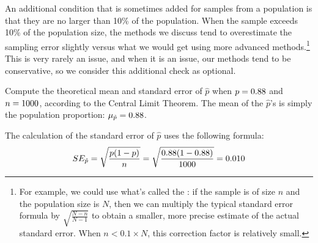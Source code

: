 An additional condition that is sometimes added for samples
from a population is that they are no larger than 10\% of
the population.
When the sample exceeds 10\% of the population size,
the methods we discuss tend to overestimate the sampling error
slightly versus what we would get using more advanced
methods.\footnote{For example, we could use what's called the
  :
  if the sample is of size $n$ and the population size is $N$,
  then we can multiply the typical standard error formula by
  $\sqrt{\frac{N-n}{N-1}}$
  to obtain a smaller, more precise estimate of the
  actual standard error.
  When $n < 0.1 \times N$, this correction factor is
  relatively small.}
This is very rarely an issue, and when it is an issue,
our methods tend to be conservative, so we consider this
additional check as optional.

\begin{examplewrap}
\begin{nexample}{Compute the theoretical mean and standard error
of $\hat{p}$ when
$p = 0.88{}$ and $n = 1000{}$,
according to the
Central Limit Theorem.}\label{sample_p88_n1000_mean_se}
The mean of the $\hat{p}$'s is simply the population proportion:
$\mu_{\hat{p}} = 0.88{}$.

The calculation of the standard error of $\hat{p}$ uses
the following formula:
\begin{align*}
SE_{\hat{p}}
    = \sqrt{\frac{p (1 - p)}{n}}
    = \sqrt{\frac{0.88{} (1 - 0.88{})}
        {1000{}}}
    = 0.010{}
\end{align*}
\end{nexample}
\end{examplewrap}

